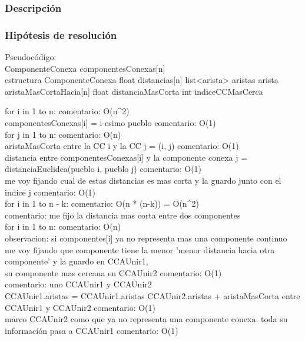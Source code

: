 \documentclass[11pt, a4paper, twoside]{article}
\begin{document}
{}

\subsubsection{Descripción} 

\subsubsection{Hipótesis de resolución}

Pseudocódigo: \\

ComponenteConexa componentesConexas[n] \\

estructura ComponenteConexa {
    float distancias[n]
    list<arista> aristas
    arista aristaMasCortaHacia[n]
    float distanciaMasCorta
    int indiceCCMasCerca
}

for i in 1 to n: comentario: O(n^2) \\
    componentesConexas[i] = i-esimo pueblo  comentario: O(1)\\
    for j in 1 to n:  comentario: O(n)\\
        aristaMasCorta entre la CC i y la CC j = (i, j) comentario: O(1) \\
        distancia entre componentesConexas[i] y la componente conexa j = distanciaEuclidea(pueblo i, pueblo j) comentario: O(1) \\
        me voy fijando cual de estas distancias es mas corta y la guardo junto con el indice j  comentario: O(1)\\

for i in 1 to n - k: comentario: O(n * (n-k)) = O(n^2)\\
    comentario: me fijo la distancia mas corta entre dos componentes \\
    for i in 1 to n:  comentario: O(n) \\ 
        observacion: si componentes[i] ya no representa mas una componente continuo \\
        me voy fijando que componente tiene la menor 'menor distancia hacia otra componente' y la guardo en CCAUnir1,\\
        su componente mas cercana en CCAUnir2 comentario: O(1) \\

    comentario: uno CCAUnir1 y CCAUnir2 \\
    CCAUnir1.aristas = CCAUnir1.aristas \union CCAUnir2.aristas + aristaMasCorta entre CCAUnir1 y CCAUnir2 comentario: O(1)\\
    marco CCAUnir2 como que ya no representa una componente conexa. toda su información pasa a CCAUnir1  comentario: O(1)\\
    
\end{document}

